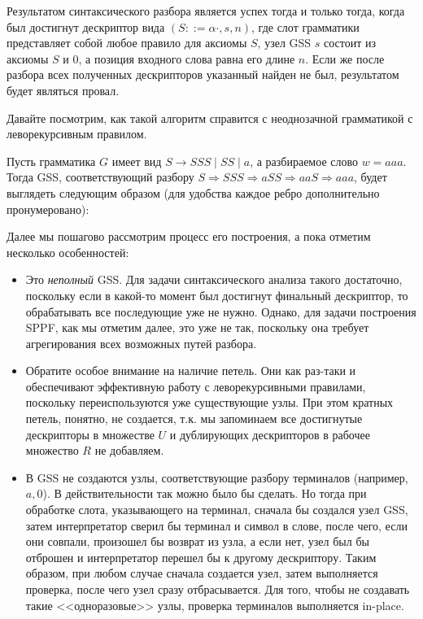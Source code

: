 Результатом синтаксического разбора является успех тогда и только тогда, когда был достигнут дескриптор вида $ (S ::= \alpha \cdot, s, n) $, где слот грамматики представляет собой любое правило для аксиомы $ S $, узел GSS $ s $ состоит из аксиомы $ S $ и 0, а позиция входного слова равна его длине $ n $. Если же после разбора всех полученных дескрипторов указанный найден не был, результатом будет являться провал.

Давайте посмотрим, как такой алгоритм справится с неоднозачной грамматикой с леворекурсивным правилом.

\begin{example}
  \label{exmpl:GLLExample1}
  Пусть грамматика $ G $ имеет вид $ S \to SSS \mid SS \mid a $, а разбираемое слово $ w = aaa $. Тогда GSS, соответствующий разбору $S \Rightarrow SSS \Rightarrow aSS \Rightarrow aaS \Rightarrow aaa$, будет выглядеть следующим образом (для удобства каждое ребро дополнительно пронумеровано):

  \begin{center}
    
  \end{center}

  Далее мы пошагово рассмотрим процесс его построения, а пока отметим несколько особенностей:

  \begin{itemize}
    \item Это \textit{неполный} GSS. Для задачи синтаксического анализа такого достаточно, поскольку если в какой-то момент был достигнут финальный дескриптор, то обрабатывать все последующие уже не нужно. Однако, для задачи построения SPPF, как мы отметим далее, это уже не так, поскольку она требует агрегирования всех возможных путей разбора.

    \item Обратите особое внимание на наличие петель. Они как раз-таки и обеспечивают эффективную работу с леворекурсивными правилами, поскольку переиспользуются уже существующие узлы. При этом кратных петель, понятно, не создается, т.к. мы запоминаем все достигнутые дескрипторы в множестве $ U $ и дублирующих дескрипторов в рабочее множество $ R $ не добавляем.

    \item В GSS не создаются узлы, соответствующие разбору терминалов (например, $a, 0$). В действительности так можно было бы сделать. Но тогда при обработке слота, указывающего на терминал, сначала бы создался узел GSS, затем интерпретатор сверил бы терминал и символ в слове, после чего, если они совпали, произошел бы возврат из узла, а если нет, узел был бы отброшен и интерпретатор перешел бы к другому дескриптору. Таким образом, при любом случае сначала создается узел, затем выполняется проверка, после чего узел сразу отбрасывается. Для того, чтобы не создавать такие <<одноразовые>> узлы, проверка терминалов выполняется in-place.
  \end{itemize}


\end{example}
